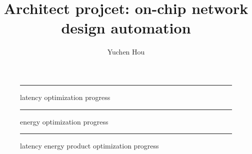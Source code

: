 \documentclass[12pt]{article}
\theoremstyle{definition}
\begin{document}
\title{Architect projcet: on-chip network design automation}
\author{Yuchen Hou}
\maketitle



\begin{figure}[htb]
  \centering
  \begin{subfigure} {\texttt{[image: latency\_trial.png]}} \end{subfigure}
  \rule{\linewidth}{1pt}
  \caption{latency optimization progress}
  \label{fig:latency_trial}
\end{figure}

\begin{figure}[htb]
  \centering
  \begin{subfigure} {\texttt{[image: energy\_trial.png]}} \end{subfigure}
  \rule{\linewidth}{1pt}
  \caption{energy optimization progress}
  \label{fig:energy_trial}
\end{figure}

\begin{figure}[htb]
  \centering
  \begin{subfigure} {\texttt{[image: latency\_energy\_product\_trial.png]}} \end{subfigure}
  \rule{\linewidth}{1pt}
  \caption{latency energy product optimization progress}
  \label{fig:latency_energy_product_trial}
\end{figure}
\end{document}
